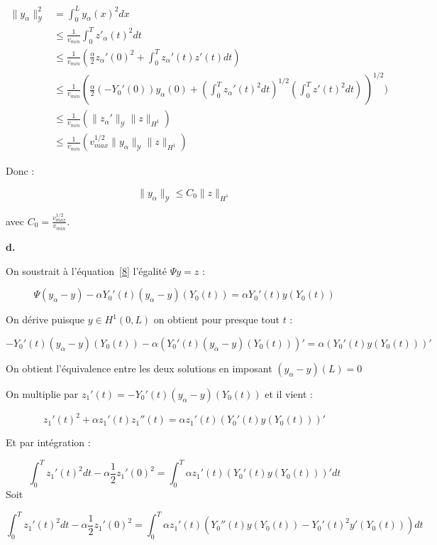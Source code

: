 \documentclass[a4paper]{article}
\newcommand{\Y}{\mathscr{Y}}
\begin{document}
\[
\begin{split}
\| y_{\alpha} \|_{\mathscr{Y}}^2 &= \int_0^L y_\alpha(x)^2dx \\
	     & \leq \displaystyle \frac{1}{v_{min}} \int_0^T z'_{\alpha}(t)^2dt\\
	     &\leq \displaystyle \frac{1}{v_{min}}
				 ( \frac{\alpha}{2} z_\alpha '(0)^2 
				 	+ \int_0^T z_\alpha '(t)z'(t)dt) \\
		 & \leq \displaystyle \frac{1}{v_{min}}
			(\frac{\alpha}{2}  (-Y_0'(0)) y_\alpha (0)
			+ (\int_0^T z_\alpha'(t)^2 dt)^{1/2}
			 (\int_0^Tz'(t)^2 dt)\,)^{1/2} ) \\
		&\leq \displaystyle \frac{1}{v_{min}}
			(\| z_\alpha'\|_{\Y} \| z \|_{H^1} ) \\
		& \leq \displaystyle \frac{1}{v_{min}}
			( v_{max}^{1/2} \| y_\alpha \|_{\Y} \| z \|_{H^1} ) 
\end{split}
\]

Donc :

\[ \| y_{\alpha} \|_{\mathscr{Y}} \leq \displaystyle C_0
                                                     \| z \|_{H^1} \]

avec $C_0= \displaystyle \frac{ v_{max}^{1/2} }{ v_{min}}$.


\vspace{0.3cm}
\textbf{d.}

On soustrait à l'équation~\eqref{8} 
l'égalité $\Psi y = z$ :

\[
\Psi (y_\alpha - y) - \alpha Y_0'(t)(y_\alpha - y)(Y_0(t)) = \alpha Y_0'(t) y(Y_0(t))
\]

On dérive puisque $y \in H^1(0,L)$ on obtient pour presque tout $t$ :

 \[
 - Y_0'(t)(y_\alpha - y)(Y_0(t)) - \alpha (Y_0'(t)(y_\alpha - y)(Y_0(t)))' = \alpha (Y_0'(t) y(Y_0(t)))'
 \]
 
 On obtient l'équivalence entre les deux solutions en imposant $(y_\alpha - y)(L)=0$
 
 On multiplie par $z_1'(t) =  - Y_0'(t)(y_\alpha - y)(Y_0(t)) $ et il vient :
 
 \[
 z_1'(t)^2 + \alpha z_1'(t)z_1 ''(t) = \alpha z_1'(t)(Y_0'(t) y(Y_0(t)))'
 \]

Et par intégration :

\[
\int_0^T z_1'(t)^2dt - \alpha \displaystyle \frac{1}{2} z_1 '(0)^2 
  = \int_0^T \alpha z_1'(t)(Y_0'(t) y(Y_0(t)))' dt
\] 
Soit 

\[
\int_0^T z_1'(t)^2dt - \alpha \displaystyle \frac{1}{2} z_1 '(0)^2 
  = \int_0^T \alpha z_1'(t)(Y_0''(t) y(Y_0(t)) - Y_0'(t)^2 y'(Y_0(t))) dt
\] 
\end{document}
